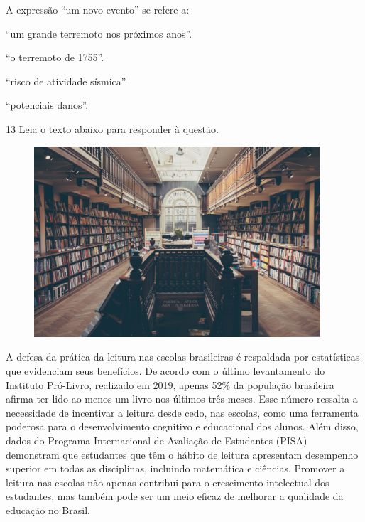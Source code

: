 A expressão ``um novo evento'' se refere a:

\begin{escolha}
  
  \item ``um grande terremoto nos próximos anos''.
  
  \item ``o terremoto de 1755''.
  
  \item ``risco de atividade sísmica''.
  
  \item ``potenciais danos''.

\end{escolha}

\pagebreak

\num{13} Leia o texto abaixo para responder à questão. 

\begin{myquote}
\begin{figure}[H]
\centering
\includegraphics[width=0.95\textwidth]{./imgSAEB_7_POR/media/image65.png}
\end{figure} 
A defesa da prática da leitura nas escolas brasileiras é respaldada por
estatísticas que evidenciam seus benefícios. De acordo com o último
levantamento do Instituto Pró-Livro, realizado em 2019, apenas 52\% da
população brasileira afirma ter lido ao menos um livro nos últimos três meses.
Esse número ressalta a necessidade de incentivar a leitura desde cedo, nas
escolas, como uma ferramenta poderosa para o desenvolvimento cognitivo e
educacional dos alunos. Além disso, dados do Programa Internacional de
Avaliação de Estudantes (PISA) demonstram que estudantes que têm o hábito de
leitura apresentam desempenho superior em todas as disciplinas, incluindo
matemática e ciências. Promover a leitura nas escolas não apenas
contribui para o crescimento intelectual dos estudantes, mas também pode ser
um meio eficaz de melhorar a qualidade da educação no Brasil.

\end{myquote}

